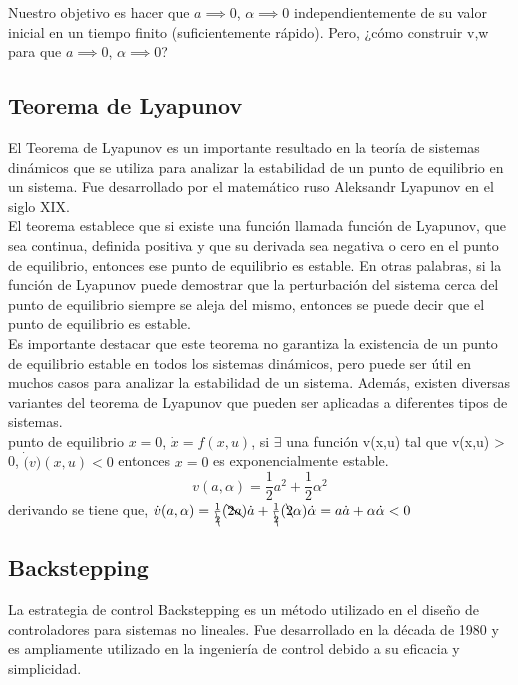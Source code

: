\documentclass[oneside,onecolumn]{article}
\begin{document}
Nuestro objetivo es hacer que $a \implies 0$, $\alpha \implies 0$ independientemente de su valor inicial en un tiempo finito (suficientemente rápido). Pero, ¿cómo construir v,w para que $a \implies 0$, $\alpha \implies 0$?

\subsection{Teorema de Lyapunov}
El Teorema de Lyapunov es un importante resultado en la teoría de sistemas dinámicos que se utiliza para analizar la estabilidad de un punto de equilibrio en un sistema. Fue desarrollado por el matemático ruso Aleksandr Lyapunov en el siglo XIX.\\

El teorema establece que si existe una función llamada función de Lyapunov, que sea continua, definida positiva y que su derivada sea negativa o cero en el punto de equilibrio, entonces ese punto de equilibrio es estable. En otras palabras, si la función de Lyapunov puede demostrar que la perturbación del sistema cerca del punto de equilibrio siempre se aleja del mismo, entonces se puede decir que el punto de equilibrio es estable.\\

Es importante destacar que este teorema no garantiza la existencia de un punto de equilibrio estable en todos los sistemas dinámicos, pero puede ser útil en muchos casos para analizar la estabilidad de un sistema. Además, existen diversas variantes del teorema de Lyapunov que pueden ser aplicadas a diferentes tipos de sistemas.\\

punto de equilibrio $x=0$, $\dot{x}=f(x,u)$, si $\exists$ una función v(x,u) tal que v(x,u) > 0, $\dot(v)(x,u)<0$ entonces $x=0$ es exponencialmente estable.
\[v(a,\alpha) = \frac{1}{2}a^{2} + \frac{1}{2}\alpha^{2}\]
derivando se tiene que, $\dot{v}(a,\alpha) = \frac{1}{\bcancel{2}}(\bcancel{2a})\dot{a}+\frac{1}{\bcancel{2}}(\bcancel{2}\alpha)\dot{\alpha} = a\dot{a}+\alpha\dot{\alpha} < 0$

\subsection{Backstepping}

La estrategia de control Backstepping es un método utilizado en el diseño de controladores para sistemas no lineales. Fue desarrollado en la década de 1980 y es ampliamente utilizado en la ingeniería de control debido a su eficacia y simplicidad.\\
\end{document}
